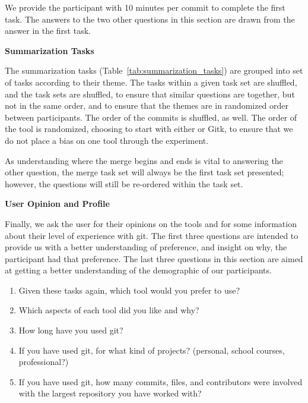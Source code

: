 \documentclass[draft]{IEEEtran}
\begin{document}

We provide the participant with 10 minutes per commit to complete the
first task. The answers to the two other questions in this section are
drawn from the answer in the first task.

\textbf{Summarization Tasks}



The summarization tasks (Table~\ref{tab:summarization_tasks}) are
grouped into  set of tasks according to their theme. The tasks within a given task set are
shuffled, and the task sets are shuffled, to ensure that similar
questions are together, but not in the same order, and to ensure that
the themes are in randomized order between participants. The order of
the commits is shuffled, as well. The order of the tool is randomized,
choosing to start with either \tool or Gitk, to ensure that we do not
place a bias on one tool through the experiment.

As understanding where the merge begins and ends is vital to answering
the other question, the merge task set will always be the first task set
presented; however, the questions will still be re-ordered within the
task set.

\textbf{User Opinion and Profile}

Finally, we ask the user for their opinions on the tools and for some
information about their level of experience with git.
The first three questions are intended to provide us with a better understanding
of preference, and insight on why, the participant had that preference.  
The last three questions in this section are aimed at getting a better
understanding of the demographic of our participants.

\begin{enumerate}
  \item Given these tasks again, which tool would you prefer to use?
  \item Which aspects of each tool did you like and why?
  \item How long have you used git?
  \item If you have used git, for what kind of projects? (personal,
    school courses, professional?)
  \item If you have used git, how many commits, files, and contributors
    were involved with the largest repository you have worked with?
\end{enumerate}
\end{document}

